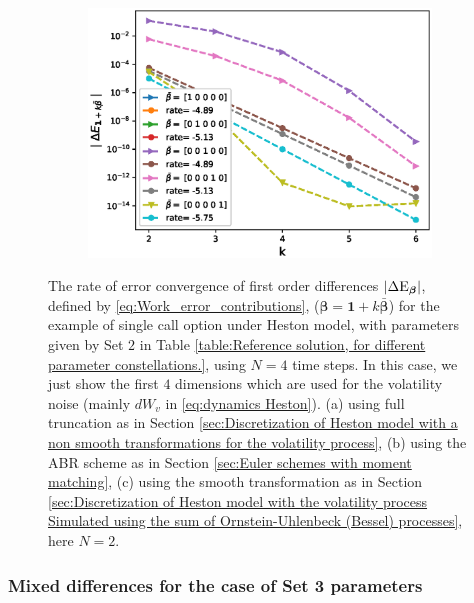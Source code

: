 \documentclass[11pt]{article}
\begin{document}
\begin{figure}[htb]
\begin{subfigure}{0.33\textwidth}
		\includegraphics[width=\linewidth]{./figures/Heston_single_call_smooth_vol/mixed_rates/set3/N_2/first_difference_heston_2steps_spot_hierarchical}
		\caption{}
		\label{fig:3}
	\end{subfigure}
	\caption{The rate of error convergence of first order differences $\left\lvert\Delta \text{E}_{\boldsymbol{\beta}}\right\rvert$, defined by \eqref{eq:Work_error_contributions}, ($\boldsymbol{\beta}=\mathbf{1}+k \bar{\boldsymbol{\beta}}$) for the example of single call option under Heston model, with parameters given by Set $2$ in Table \ref{table:Reference solution, for different parameter constellations.}, using $N=4$ time steps. In this case, we just show  the first  $4$ dimensions which are used for the volatility noise (mainly $dW_v$ in \eqref{eq:dynamics Heston}). (a) using full truncation as in Section \ref{sec:Discretization of Heston model with a non smooth transformations for the volatility process}, (b) using the ABR scheme as in Section \ref{sec:Euler schemes with moment matching}, (c) using the smooth transformation as in Section \ref{sec:Discretization of Heston model with the volatility process Simulated using the sum of  Ornstein-Uhlenbeck (Bessel) processes}, here $N=2$.}
	\label{fig:first_diff_Heston_call_N_4_set3}	
\end{figure}
\FloatBarrier
\subsubsection*{Mixed differences for the case of Set 3 parameters}
\end{document}
